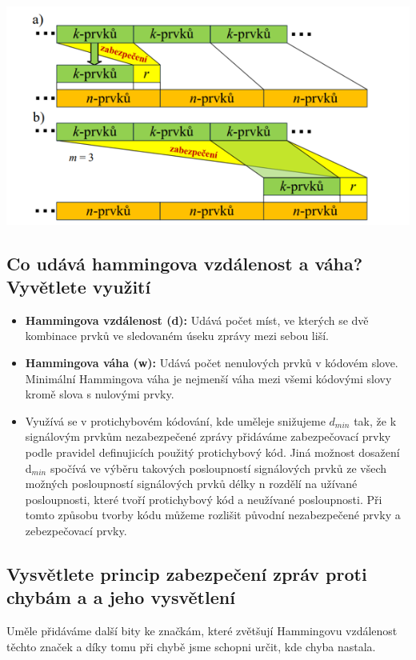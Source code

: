 \includegraphics[]{images/zabezpečování.png}

\subsection{Co udává hammingova vzdálenost a váha? Vyvětlete využití}

\begin{itemize}
    \item \textbf{Hammingova vzdálenost (d):} Udává počet míst, ve kterých se dvě kombinace prvků ve sledovaném úseku zprávy mezi sebou liší.
    

    
    \item \textbf{Hammingova váha (w):} Udává počet nenulových prvků v kódovém slove.
    Minimální Hammingova váha je nejmenší váha mezi všemi kódovými slovy kromě slova s nulovými prvky.
    
    \item Využívá se v protichybovém kódování, kde uměleje snižujeme $d_{min}$ tak, že k signálovým prvkům nezabezpečené zprávy přidáváme zabezpečovací prvky podle pravidel definujicích použitý protichybový kód.
    Jiná možnost dosažení d$_{min}$ spočívá ve výběru takových posloupností signálových prvků ze všech možných posloupností signálových prvků délky n rozdělí na užívané posloupnosti, které tvoří protichybový kód a neužívané posloupnosti.  Při tomto způsobu tvorby kódu můžeme rozlišit původní nezabezpečené prvky a zebezpečovací prvky.
\end{itemize}
\subsection{Vysvětlete princip zabezpečení zpráv proti chybám a a jeho vysvětlení}
Uměle přidáváme další bity ke značkám, které zvětšují Hammingovu vzdálenost těchto značek a díky tomu při chybě jsme schopni určit, kde chyba nastala.

